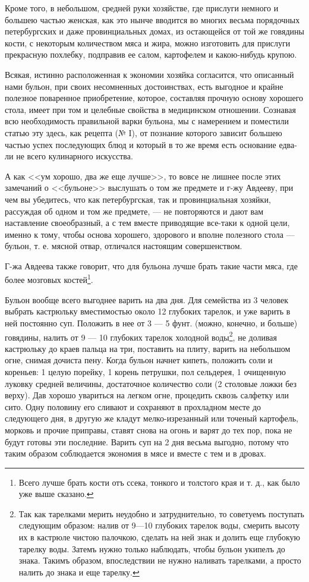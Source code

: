 Кроме того, в небольшом, средней руки хозяйстве, где прислуги немного и большею частью женская, как это нынче вводится во многих весьма порядочных петербургских и даже провинциальных домах, из остающейся от той же говядины кости, с некоторым количеством мяса и жира, можно изготовить для прислуги прекрасную похлебку, подправив ее салом, картофелем и какою-нибудь крупою.

Всякая, истинно расположенная к экономии хозяйка согласится, что описанный нами бульон, при своих несомненных достоинствах, есть выгодное и крайне полезное поваренное приобретение, которое, составляя прочную основу хорошего стола, имеет при том и целебные свойства в медицинском отношении. Сознавая всю необходимость правильной варки бульона, мы с намерением и поместили статью эту здесь, как рецепта (№ I), от познание которого зависит большею частью успех последующих блюд и который в то же время есть основание едва-ли не всего кулинарного искусства.

А как <<ум хорошо, два же еще лучше>>, то вовсе не лишнее после этих замечаний о <<бульоне>> выслушать о том же предмете и г-жу Авдееву, при чем вы убедитесь, что как петербургская, так и провинциальная хозяйки, рассуждая об одном и том же предмете, — не повторяются и дают вам наставление своеобразный, а с тем вместе приводящие все-таки к одной цели, именно к тому, чтобы основа хорошего, здорового и вполне полезного стола — бульон, т. е. мясной отвар, отличался настоящим совершенством.

Г-жа Авдеева также говорит, что для бульона лучше брать такие части мяса, где более мозговых костей\footnote{Всего лучше брать кости отъ ссека, тонкого и толстого края и т. д., как было уже выше сказано.}.

Бульон вообще всего выгоднее варить на два дня. Для семейства из 3 человек выбрать кастрюльку вместимостью около 12 глубоких тарелок, и уже варить в ней постоянно суп. Положить в нее от 3 — 5 фунт. (можно, конечно, и больше) говядины, налить от 9 — 10 глубоких тарелок холодной воды\footnote{Так как тарелками мерить неудобно и затруднительно, то советуемъ поступать следующим образом: налив от 9—10 глубоких тарелок воды, смерить высоту их в кастрюле чистою палочкою, сделать на ней знак и долить еще глубокую тарелку воды. Затемъ нужно только наблюдать, чтобы бульон укипелъ до знака. Такимъ образом, впоследствии не нужно наливать тарелками, а просто налить до знака и еще тарелку.}, не доливая кастрюльку до краев пальца на три, поставить на плиту, варить на небольшом огне, снимая дочиста пену. Когда бульон начнет кипеть, положить соли и кореньев: 1 целую порейку, 1 корень петрушки, пол сельдерея, 1 очищенную луковку средней величины, достаточное количество соли (2 столовые ложки без верху). Дав хорошо увариться на легком огне, процедить сквозь салфетку или сито. Одну половину его сливают и сохраняют в прохладном месте до следующего дня, в другую же кладут мелко-изрезанный или точеный картофель, морковь и прочие приправы, ставят снова на огонь и варят до тех пор, пока не будут готовы эти последние. Варить суп на 2 дня весьма выгодно, потому что таким образом соблюдается экономия в мясе и вместе с тем и в дровах.

